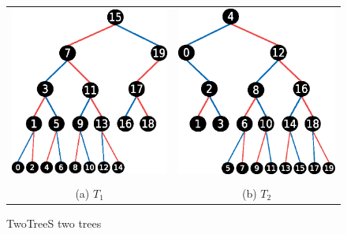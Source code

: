 \documentclass[sigplan,review,anonymous]{acmart}\settopmatter{printfolios=true,printccs=false,printacmref=false}
\begin{document}
\begin{figure}[t]
 
\begin{tabular}{cc}
\includegraphics[scale=0.47]{images/unbalanced-S-T1-gap.eps}  & \hspace{0.4cm} \includegraphics[scale=0.47]{images/unbalanced-S-T2-gap.eps} \\ \\
(a) $T_1$ & (b) $T_2$ \\
\end{tabular}
\caption{TwoTreeS \cite{sanders_two-tree_2009} two trees }
\label{fig:twoTreeS}
\end{figure}
\end{document}
